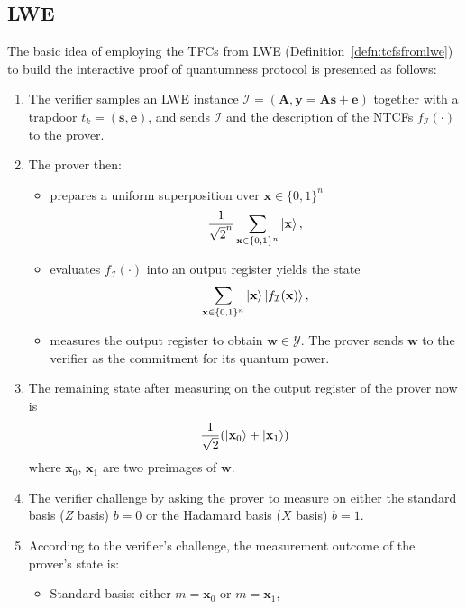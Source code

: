 \documentclass[cryptography,review,submit,pdftex,moreauthors,amsmath,amssymb,aps,strict]{Definitions/mdpi}
\begin{document}
\subsection{LWE}
The basic idea of employing the TFCs from LWE (Definition~\ref{defn:tcfsfromlwe}) to build the interactive proof of quantumness protocol is presented as follows:
\begin{enumerate}
    \item The verifier samples an LWE instance $\mathcal{I}=(\mathbf{A},\mathbf{y}=\mathbf{A}\mathbf{s}+\mathbf{e})$ together with a trapdoor $t_{k}=(\mathbf{s},\mathbf{e})$, and sends $\mathcal{I}$ and the description of the NTCFs $f_{\mathcal{I}}(\cdot)$ to the prover.
    \item The prover then:
    \begin{itemize}
        \item prepares a uniform superposition over $\mathbf{x}\in\{0,1\}^n$
        \begin{align}
            \frac{1}{\sqrt{2}^n}\sum_{\mathbf{x}\in\{0,1\}^n}\ket{\mathbf{x}},
        \end{align}
        \item evaluates $f_\mathcal{I}(\cdot)$ into an output register yields the state
        \begin{align}
            \sum_{\mathbf{x}\in\{0,1\}^n}\ket{\mathbf{x}}\ket{f_{\mathcal{I}}(\mathbf{x})},
        \end{align}        
        \item measures the output register to obtain $\mathbf{w}\in\mathcal{Y}$.
    The prover sends $\mathbf{w}$ to the verifier as the commitment for its quantum power.
    \end{itemize}
    \item The remaining state after measuring on the output register of the prover now is
    \begin{align}
        \frac{1}{\sqrt{2}}(\ket{\mathbf{x}_0}+\ket{\mathbf{x}_1})
    \end{align}
    where $\mathbf{x}_0$, $\mathbf{x}_1$ are two preimages of $\mathbf{w}$.
    \item The verifier challenge by asking the prover to measure on either the standard basis ($Z$ basis) $b=0$ or the Hadamard basis ($X$ basis) $b=1$.
    \item According to the verifier's challenge, the measurement outcome of the prover's state is:
    \begin{itemize}
        \item Standard basis: either $m=\mathbf{x}_0$ or $m=\mathbf{x}_1$, 

\end{itemize}
\end{enumerate}
\end{document}

